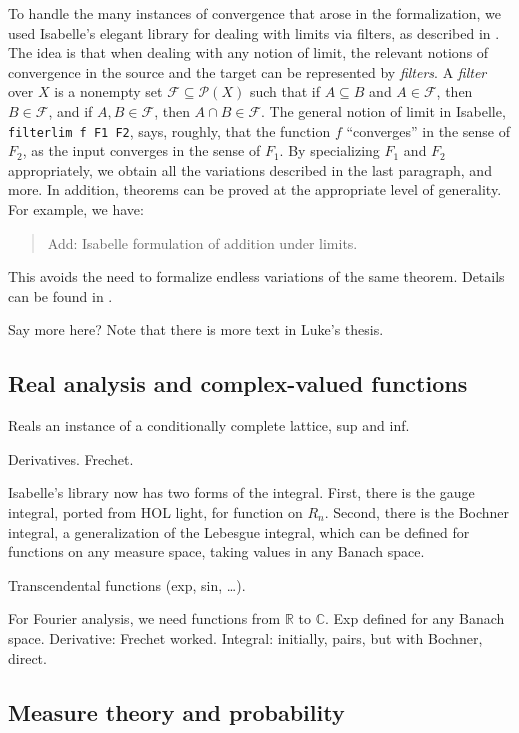 \documentclass{svjour3}
\newcommand{\todo}[1]{{\color{red}#1}}
\newcommand{\RR}{\mathbb{R}}
\newcommand{\CC}{\mathbb{C}}
\begin{document}
To handle the many instances of convergence that arose in the formalization, we used Isabelle's elegant library for dealing with limits via filters, as described in \cite{hoelzl:et:al:13}. The idea is that when dealing with any notion of limit, the relevant notions of convergence in the source and the target can be represented by \emph{filters}. A {\em filter} over $X$ is a nonempty set $\mathcal F \subseteq \mathcal P(X)$ such that if $A \subseteq B$ and $A \in \mathcal F$, then $B \in \mathcal F$, and if $A, B \in \mathcal F$, then $A \cap B \in \mathcal F$. The general notion of limit in Isabelle, {\tt filterlim f F1 F2}, says, roughly, that the function $f$ ``converges'' in the sense of $F_2$, as the input converges in the sense of $F_1$. By specializing $F_1$ and $F_2$ appropriately, we obtain all the variations described in the last paragraph, and more. In addition, theorems can be proved at the appropriate level of generality. For example, we have:
\begin{quote}
 \todo{Add: Isabelle formulation of addition under limits.}
\end{quote}
This avoids the need to formalize endless variations of the same theorem. Details can be found in \cite{hoelzl:et:al:13}.

\todo{Say more here? Note that there is more text in Luke's thesis.}


\subsection{Real analysis and complex-valued functions}

\todo{
Reals an instance of a conditionally complete lattice, sup and inf.

Derivatives. Frechet.

Isabelle's library now has two forms of the integral. First, there is the gauge integral, ported from HOL light, for function on $R_n$. Second, there is the Bochner integral, a generalization of the Lebesgue integral, which can be defined for functions on any measure space, taking values in any Banach space.

Transcendental functions (exp, sin, \ldots).

For Fourier analysis, we need functions from $\RR$ to $\CC$. Exp defined for any Banach space. Derivative: Frechet worked. Integral: initially, pairs, but with Bochner, direct.
}

\subsection{Measure theory and probability}
\end{document}
